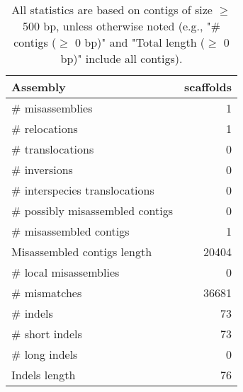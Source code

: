 \documentclass[12pt,a4paper]{article}
\begin{document}
\begin{table}[ht]
\begin{center}
\caption{All statistics are based on contigs of size $\geq$ 500 bp, unless otherwise noted (e.g., "\# contigs ($\geq$ 0 bp)" and "Total length ($\geq$ 0 bp)" include all contigs).}
\begin{tabular}{|l*{1}{|r}|}
\hline
Assembly & scaffolds \\ \hline
\# misassemblies & 1 \\ \hline
\hspace{5mm}\# relocations & 1 \\ \hline
\hspace{5mm}\# translocations & 0 \\ \hline
\hspace{5mm}\# inversions & 0 \\ \hline
\hspace{5mm}\# interspecies translocations & 0 \\ \hline
\# possibly misassembled contigs & 0 \\ \hline
\# misassembled contigs & 1 \\ \hline
Misassembled contigs length & 20404 \\ \hline
\# local misassemblies & 0 \\ \hline
\# mismatches & 36681 \\ \hline
\# indels & 73 \\ \hline
\hspace{5mm}\# short indels & 73 \\ \hline
\hspace{5mm}\# long indels & 0 \\ \hline
Indels length & 76 \\ \hline
\end{tabular}
\end{center}
\end{table}
\end{document}

